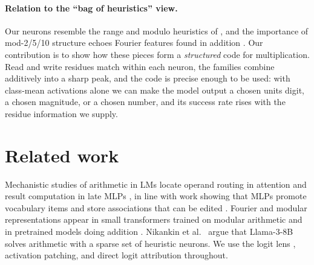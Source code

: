\documentclass[11pt]{article}
\begin{document}
\paragraph{Relation to the ``bag of heuristics'' view.} Our neurons resemble the range and modulo heuristics of \cite{nikankin2024}, and the importance of mod-2/5/10 structure echoes Fourier features found in addition \cite{zhou2024,kantamneni2025}. Our contribution is to show how these pieces form a \emph{structured} code for multiplication. Read and write residues match within each neuron, the families combine additively into a sharp peak, and the code is precise enough to be used: with class-mean activations alone we can make the model output a chosen units digit, a chosen magnitude, or a chosen number, and its success rate rises with the residue information we supply.

\section{Related work}
Mechanistic studies of arithmetic in LMs locate operand routing in attention and result computation in late MLPs \cite{stolfo2023}, in line with work showing that MLPs promote vocabulary items \cite{geva2022} and store associations that can be edited \cite{meng2022}. Fourier and modular representations appear in small transformers trained on modular arithmetic \cite{nanda2023} and in pretrained models doing addition \cite{zhou2024,kantamneni2025}. Nikankin et al.~\cite{nikankin2024} argue that Llama-3-8B solves arithmetic with a sparse set of heuristic neurons. We use the logit lens \cite{nostalgebraist2020}, activation patching, and direct logit attribution throughout.
\end{document}
